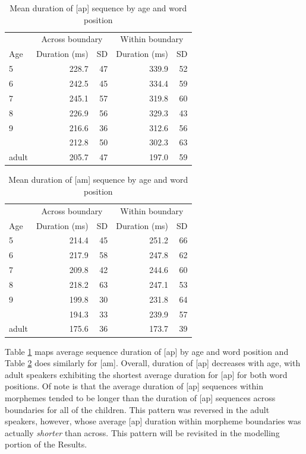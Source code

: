 \documentclass[
]{article}
\begin{document}
\begin{table}

\caption{\label{tab:ap-dur-tbl}Mean duration of [ap] sequence by age and word position}
\centering
\begin{tabular}[t]{lrrrr}
\toprule
\multicolumn{1}{c}{ } & \multicolumn{2}{c}{Across boundary} & \multicolumn{2}{c}{Within boundary} \\
\cmidrule(l{3pt}r{3pt}){2-3} \cmidrule(l{3pt}r{3pt}){4-5}
Age & Duration (ms) & SD  & Duration (ms) & SD\\
\midrule
5 & 228.7 & 47 & 339.9 & 52\\
6 & 242.5 & 45 & 334.4 & 59\\
7 & 245.1 & 57 & 319.8 & 60\\
8 & 226.9 & 56 & 329.3 & 43\\
9 & 216.6 & 36 & 312.6 & 56\\
\addlinespace
10 & 212.8 & 50 & 302.3 & 63\\
adult & 205.7 & 47 & 197.0 & 59\\
\bottomrule
\end{tabular}
\end{table}

\begin{table}

\caption{\label{tab:am-dur-tbl}Mean duration of [am] sequence by age and word position}
\centering
\begin{tabular}[t]{lrrrr}
\toprule
\multicolumn{1}{c}{ } & \multicolumn{2}{c}{Across boundary} & \multicolumn{2}{c}{Within boundary} \\
\cmidrule(l{3pt}r{3pt}){2-3} \cmidrule(l{3pt}r{3pt}){4-5}
Age & Duration (ms) & SD  & Duration (ms) & SD\\
\midrule
5 & 214.4 & 45 & 251.2 & 66\\
6 & 217.9 & 58 & 247.8 & 62\\
7 & 209.8 & 42 & 244.6 & 60\\
8 & 218.2 & 63 & 247.1 & 53\\
9 & 199.8 & 30 & 231.8 & 64\\
\addlinespace
10 & 194.3 & 33 & 239.9 & 57\\
adult & 175.6 & 36 & 173.7 & 39\\
\bottomrule
\end{tabular}
\end{table}

Table \ref{tab:ap-dur-tbl} maps average sequence duration of {[}ap{]} by age and word position and Table \ref{tab:am-dur-tbl} does similarly for {[}am{]}. Overall, duration of {[}ap{]} decreases with age, with adult speakers exhibiting the shortest average duration for {[}ap{]} for both word positions. Of note is that the average duration of {[}ap{]} sequences within morphemes tended to be longer than the duration of {[}ap{]} sequences across boundaries for all of the children. This pattern was reversed in the adult speakers, however, whose average {[}ap{]} duration within morpheme boundaries was actually \emph{shorter} than across. This pattern will be revisited in the modelling portion of the Results.
\end{document}

